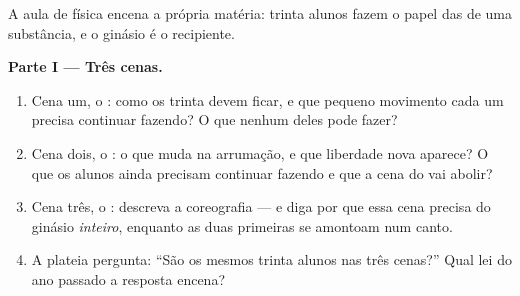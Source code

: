 \begin{problem}\label{pb:g7:states-of-matter:1}
A aula de física encena a própria matéria: trinta alunos fazem o
papel das  de uma substância, e o ginásio é o recipiente.

\medskip\noindent\textbf{Parte I --- Três cenas.}
\begin{enumerate}
  \item Cena um, o : como os trinta devem ficar, e que pequeno
        movimento cada um precisa continuar fazendo? O que nenhum
        deles pode fazer?
  \item Cena dois, o : o que muda na arrumação, e que
        liberdade nova aparece? O que os alunos ainda precisam
        continuar fazendo e que a cena do  vai abolir?
  \item Cena três, o : descreva a coreografia --- e diga por que
        essa cena precisa do ginásio \emph{inteiro}, enquanto as duas
        primeiras se amontoam num canto.
  \item A plateia pergunta: ``São os mesmos trinta alunos nas três
        cenas?'' Qual lei do ano passado a resposta encena?
\end{enumerate}


\end{problem}

